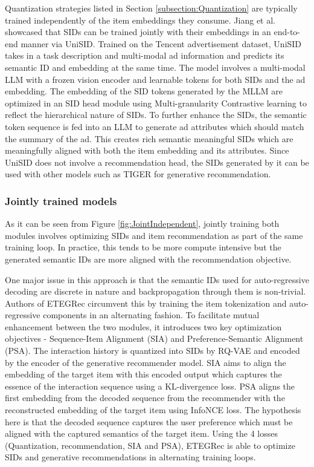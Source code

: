 \documentclass[11pt,a4paper]{article}
\begin{document}
Quantization strategies listed in Section \ref{subsection:Quantization} are typically trained independently of the item embeddings they consume. Jiang et al. \cite{2026UniSID_jiang2026endtoendsemanticidgeneration} showcased that SIDs can be trained jointly with their embeddings in an end-to-end manner via UniSID. Trained on the Tencent advertisement dataset, UniSID takes in a task description and multi-modal ad information and predicts its semantic ID and embedding at the same time. The model involves a multi-modal LLM with a frozen vision encoder and learnable tokens for both SIDs and the ad embedding. The embedding of the SID tokens generated by the MLLM are optimized in an SID head module using Multi-granularity Contrastive learning to reflect the hierarchical nature of SIDs. To further enhance the SIDs, the semantic token sequence is fed into an LLM to generate ad attributes which should match the summary of the ad. This creates rich semantic meaningful SIDs which are meaningfully aligned with both the item embedding and its attributes. Since UniSID does not involve a recommendation head, the SIDs generated by it can be used with other models such as TIGER for generative recommendation.

\subsubsection{Jointly trained models}
As it can be seen from Figure \ref{fig:JointIndependent}, jointly training both modules involves optimizing SIDs and item recommendation as part of the same training loop. In practice, this tends to be more compute intensive but the generated semantic IDs are more aligned with the recommendation objective.

One major issue in this approach is that the semantic IDs used for auto-regressive decoding are discrete in nature and backpropagation through them is non-trivial. Authors of ETEGRec \cite{2024ETEGRec_liu2025generativerecommenderendtoendlearnable} circumvent this by training the item tokenization and auto-regressive components in an alternating fashion. To facilitate mutual enhancement between the two modules, it introduces two key optimization objectives - Sequence-Item Alignment (SIA) and Preference-Semantic Alignment (PSA). The interaction history is quantized into SIDs by RQ-VAE and encoded by the encoder of the generative recommender model. SIA aims to align the embedding of the target item with this encoded output which captures the essence of the interaction sequence using a KL-divergence loss. PSA aligns the first embedding from the decoded sequence from the recommender with the reconstructed embedding of the target item using InfoNCE loss. The hypothesis here is that the decoded sequence captures the user preference which must be aligned with the captured semantics of the target item. Using the 4 losses (Quantization, recommendation, SIA and PSA), ETEGRec is able to optimize SIDs and generative recommendations in alternating training loops.
\end{document}
